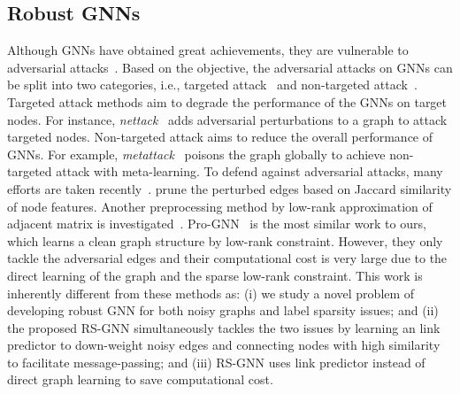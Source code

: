 \subsection{Robust GNNs}
Although GNNs have obtained great achievements, they are vulnerable to adversarial attacks~\cite{wu2019adversarial,dai2018adversarial,zugner2018adversarial,zugner2019adversarial}. Based on the objective, the adversarial attacks on GNNs can be split into two categories, i.e., targeted attack~\cite{dai2018adversarial,zugner2018adversarial} and non-targeted attack~\cite{zugner2019adversarial}. Targeted attack methods aim to degrade the performance of the GNNs on target nodes. 
For instance, \textit{nettack}~\cite{zugner2018adversarial} adds adversarial perturbations to a graph to attack targeted nodes. Non-targeted attack aims to reduce the overall performance of GNNs. For example, \textit{metattack}~\cite{zugner2019adversarial} poisons the graph globally to achieve non-targeted attack with meta-learning. To defend against adversarial attacks, many efforts are taken recently~\cite{zhu2019robust,wu2019adversarial,entezari2020all,jin2020graph,tang2020transferring,zhang2020gnnguard}. \cite{wu2019adversarial} prune the perturbed edges based on Jaccard similarity of node features. Another preprocessing method by low-rank approximation of adjacent matrix is investigated~\cite{entezari2020all}. Pro-GNN~\cite{jin2020graph} is the most similar work to ours, which learns a clean graph structure by low-rank constraint. However, they only tackle the adversarial edges and their computational cost is very large due to the direct learning of the graph and the sparse low-rank constraint.
This work is inherently different from these methods as: (i) we study a novel problem of developing robust GNN for both noisy graphs and label sparsity issues; and (ii) the proposed RS-GNN simultaneously tackles the two issues by learning an link predictor to 
down-weight noisy edges and connecting nodes with high similarity to facilitate message-passing; 
and (iii) RS-GNN uses link predictor instead of direct graph learning to save computational cost. 